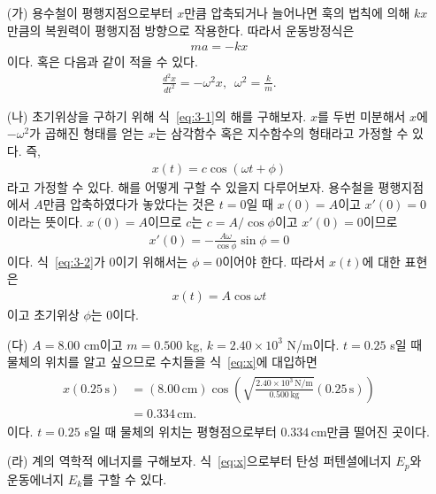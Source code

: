 \documentclass[floatfix,nofootinbib,superscriptaddress,fleqn]{revtex4-2}
\begin{document}
 \begin{itemize}
  \item[(가)] 
  용수철이 평행지점으로부터 $x$만큼 압축되거나 늘어나면 훅의 법칙에 의해 $kx$만큼의
  복원력이 평행지점 방향으로 작용한다. 따라서 운동방정식은
  \begin{align}
    ma = -kx
  \end{align} 
  이다. 혹은 다음과 같이 적을 수 있다.
  \begin{align}\label{eq:3-1}
    \frac{d^2x}{dt^2} = -\omega^2x,\,\,\,\omega^2 = \frac{k}{m}.
  \end{align}
  \item[(나)] 
  초기위상을 구하기 위해 식~\eqref{eq:3-1}의 해를 구해보자. $x$를 두번 미분해서
  $x$에 $-\omega^2$가 곱해진 형태를 얻는 $x$는 삼각함수 혹은 지수함수의 형태라고
  가정할 수 있다. 즉,
  \begin{align}
    x(t) 
    =c\cos(\omega t + \phi)
  \end{align}
  라고 가정할 수 있다. 해를 어떻게 구할 수
  있을지 다루어보자. 
  용수철을 평행지점에서 $A$만큼 압축하였다가 놓았다는 것은
  $t=0$일 때 $x(0)=A$이고 $x'(0)=0$이라는 뜻이다. 
  $x(0)=A$이므로 $c$는 $c= A/\cos\phi$이고 $x'(0)=0$이므로
  \begin{align}\label{eq:3-2}
    x'(0) = -\frac{A\omega}{\cos\phi}\sin\phi = 0
  \end{align}
  이다. 식~\eqref{eq:3-2}가 $0$이기 위해서는 $\phi=0$이어야 한다. 따라서 $x(t)$에
  대한 표현은
  \begin{align}\label{eq:x}
    x(t) = A\cos\omega t
  \end{align}
  이고 초기위상 $\phi$는 $0$이다.
  \item[(다)] 
  $A=8.00$ cm이고 $m=0.500$ kg, $k=2.40\times 10^3$ N/m이다. 
  $t=0.25$ s일 때 물체의 위치를 알고 싶으므로 수치들을
  식~\eqref{eq:x}에 대입하면
  \begin{align}
    \begin{split}
      x(0.25\,\mathrm{s}) &= (8.00\,\mathrm{cm})
      \cos\left(
        \sqrt{\frac{2.40\times 10^3\,\mathrm{N/m}}{0.500\,\mathrm{kg}}}
        (0.25\,\mathrm{s})\right) \\
        &=0.334\,\mathrm{cm}.
      \end{split}
  \end{align}
  이다. $t=0.25$ s일 때 물체의 위치는 평형점으로부터 $0.334\,\mathrm{cm}$만큼
  떨어진 곳이다.
  \item[(라)]
  계의 역학적 에너지를 구해보자. 식~\eqref{eq:x}으로부터
  탄성 퍼텐셜에너지 $E_p$와 운동에너지 $E_k$를 구할 수 있다.

\end{itemize}
\end{document}
